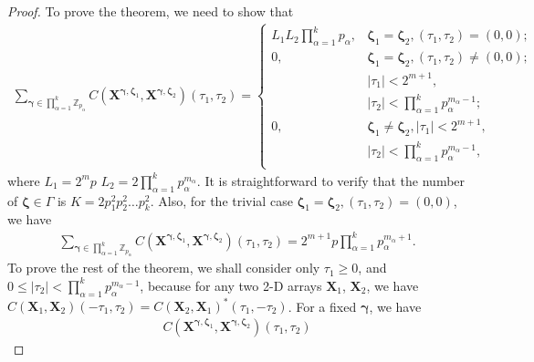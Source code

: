 \documentclass[pdflatex,sn-mathphys-num]{sn-jnl}%
\theoremstyle{thmstyleone}
\begin{document}
	\begin{proof}
		To prove the theorem, we need to show that
		\begin{equation}
			\begin{split}
				\sum_{\bm{\gamma} \in \prod_{\alpha=1}^{k} \mathbb{Z}_{p_\alpha}}^{} C\left( \mathbf{X}^{\bm{\gamma},\bm{\zeta}_1}, \mathbf{X}^{\bm{\gamma},\bm{\zeta}_2} \right) (\tau_1, \tau_2)
				=
				\begin{cases}
					L_1 L_2 \prod_{\alpha=1}^{k} p_\alpha,& \bm{\zeta}_1 = \bm{\zeta}_2, (\tau_1, \tau_2 ) = (0,0);\\
					0, & \bm{\zeta}_1 = \bm{\zeta}_2, (\tau_1, \tau_2 ) \neq (0,0);\\
					& \left| \tau_1 \right| < 2^{m+1}, \\
					& \left| \tau_2 \right| < \prod_{\alpha=1}^{k} p_\alpha^{m_\alpha-1};\\
					0, & \bm{\zeta}_1 \neq \bm{\zeta}_2, \left| \tau_1 \right| < 2^{m+1},\\
					& \left| \tau_2 \right| < \prod_{\alpha=1}^{k} p_\alpha^{m_\alpha-1},\\
				\end{cases}
			\end{split}
		\end{equation}
		where $L_1=2^{m}p$ $ L_2= 2\prod_{\alpha=1}^{k} p_\alpha^{m_\alpha}$.
		It is straightforward to verify that the number of $\bm{\zeta} \in \Gamma $ is $K= 2 p_1^2 p_2^2 \dots p_k^2$. Also, for the trivial case $\bm{\zeta}_1 = \bm{\zeta}_2, (\tau_1, \tau_2 ) = (0,0)$, we have
		\begin{equation}
			\begin{split}
				\sum_{\bm{\gamma} \in \prod_{\alpha=1}^{k} \mathbb{Z}_{p_\alpha}}^{} C\left( \mathbf{X}^{\bm{\gamma},\bm{\zeta}_1}, \mathbf{X}^{\bm{\gamma},\bm{\zeta}_2} \right) (\tau_1, \tau_2)=	2^{m+1} p \prod_{\alpha=1}^{k} p_\alpha^{m_\alpha+1}.
			\end{split}
		\end{equation}
		To prove the rest of the theorem, we shall consider only $\tau_1 \geq 0$, and $0 \leq \left| \tau_2\right| < \prod_{\alpha=1}^{k} p_\alpha^{m_\alpha-1}$, because for any two 2-D arrays $\mathbf{X}_1$, $\mathbf{X}_2$, we have $C(\mathbf{X}_1, \mathbf{X}_2) (-\tau_1, \tau_2)= C(\mathbf{X}_2, \mathbf{X}_1)^* (\tau_1, -\tau_2)$. For a fixed $\bm{\gamma}$, we have
		\begin{equation}
			\begin{split}
				C\left( \mathbf{X}^{\bm{\gamma},\bm{\zeta}_1}, \mathbf{X}^{\bm{\gamma}, \bm{\zeta}_2} \right) (\tau_1, \tau_2)

\end{split}
\end{equation}
\end{proof}
\end{document}
